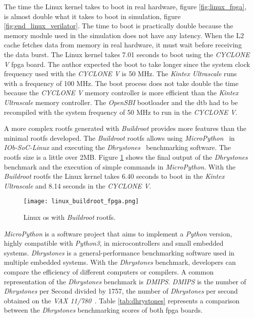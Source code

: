 The time the Linux kernel takes to boot in real hardware, figure \ref{fig:linux_fpga}, is almost double what it takes to boot in simulation, figure \ref{fig:end_linux_verilator}. The time to boot is practically double because the memory module used in the simulation does not have any latency. When the L2 cache fetches data from memory in real hardware, it must wait before receiving the data burst. The Linux kernel takes 7.01 seconds to boot using the \textit{CYCLONE V} \acrshort{fpga} board. The author expected the boot to take longer since the system clock frequency used with the \textit{CYCLONE V} is 50 MHz. The \textit{Kintex Ultrascale} runs with a frequency of 100 MHz. The boot process does not take double the time because the \textit{CYCLONE V} memory controller is more efficient than the \textit{Kintex Ultrascale} memory controller.  The \textit{OpenSBI} bootloader and the \acrlong{dtb} had to be recompiled with the system frequency of 50 MHz to run in the \textit{CYCLONE V}.

A more complex \acrshort{rootfs} generated with \textit{Buildroot} provides more features than the minimal \acrshort{rootfs} developed. The \textit{Buildroot} \acrshort{rootfs} allows using \textit{MicroPython}~\cite{tollervey2017programming} in \textit{IOb-SoC-Linux} and executing the \textit{Dhrystones}~\cite{weicker1984dhrystone} benchmarking software. The \acrshort{rootfs} size is a little over 2MB. Figure \ref{fig:linux_buildroot_fpga} shows the final output of the \textit{Dhrystones} benchmark and the execution of simple commands in \textit{MicroPython}. With the \textit{Buildroot} \acrshort{rootfs} the Linux kernel takes 6.40 seconds to boot in the \textit{Kintex Ultrascale} and 8.14 seconds in the \textit{CYCLONE V}.

\begin{figure}[!ht]
    \centering
    \texttt{[image: linux\_buildroot\_fpga.png]}
    \caption{Linux \acrshort{os} with \textit{Buildroot} \acrshort{rootfs}.}
    \label{fig:linux_buildroot_fpga}
\end{figure}

\textit{MicroPython} is a software project that aims to implement a \textit{Python} version, highly compatible with \textit{Python3}, in microcontrollers and small embedded systems. \textit{Dhrystones} is a general-performance benchmarking software used in multiple embedded systems. With the \textit{Dhrystones} benchmark, developers can compare the efficiency of different computers or compilers. A common representation of the \textit{Dhrystones} benchmark is \textit{DMIPS}. \textit{DMIPS} is the number of \textit{Dhrystones} per Second divided by 1757, the number of \textit{Dhrystones} per second obtained on the \textit{VAX 11/780}~\cite{emer1984characterization}. Table \ref{tab:dhrystones} represents a comparison between the \textit{Dhrystones} benchmarking scores of both \acrshort{fpga} boards.

